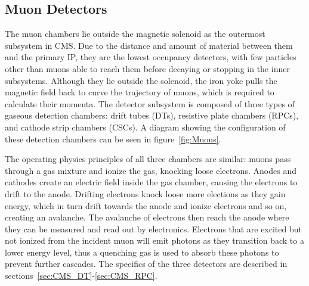 \subsection{Muon Detectors} \label{sec:CMS_Muons}
The muon chambers lie outside the magnetic solenoid as the outermost subsystem in CMS. Due to the distance and amount of material between them and the primary IP, they are the lowest occupancy detectors, with few particles other than muons able to reach them before decaying or stopping in the inner subsystems. Although they lie outside the solenoid, the iron yoke pulls the magnetic field back to curve the trajectory of muons, which is required to calculate their momenta. The detector subsystem is composed of three types of gaseous detection chambers: drift tubes (DTs), resistive plate chambers (RPCs), and cathode strip chambers (CSCs). A diagram showing the configuration of these detection chambers can be seen in figure~\ref{fig:Muons}.

The operating physics principles of all three chambers are similar: muons pass through a gas mixture and ionize the gas, knocking loose electrons. Anodes and cathodes create an electric field inside the gas chamber, causing the electrons to drift to the anode. Drifting electrons knock loose more elections as they gain energy, which in turn drift towards the anode and ionize electrons and so on, creating an avalanche. The avalanche of electrons then reach the anode where they can be measured and read out by electronics. Electrons that are excited but not ionized from the incident muon will emit photons as they transition back to a lower energy level, thus a quenching gas is used to absorb these photons to prevent further cascades. The specifics of the three detectors are described in sections~\ref{sec:CMS_DT}-\ref{sec:CMS_RPC}.

